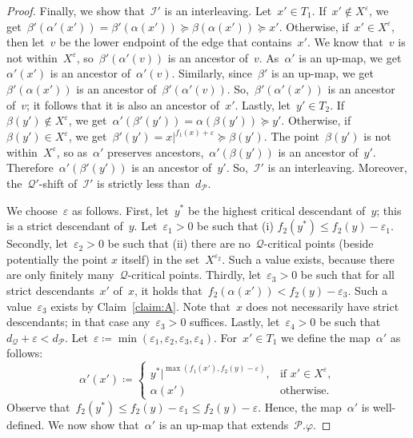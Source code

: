 \documentclass[a4paper,UKenglish, autoref, thm-restate, cleveref]{lipics-v2021}
\newcommand{\an}[2]{#1|^{#2}}
\newcommand{\resdist}[1]{d_{#1}}
\newcommand{\eps}{\varepsilon}
\renewcommand{\phi}{\varphi}
\newcommand{\I}{\mathcal{I}}
\renewcommand{\P}{\mathcal{P}}
\newcommand{\Q}{\mathcal{Q}}
\begin{document}
\begin{proof}
    Finally, we show that~$\I'$ is an interleaving.
    Let~$x' \in T_1$.
    If~$x' \notin X^\eps$, we get~$\beta'(\alpha'(x')) = \beta'(\alpha(x')) \succeq \beta(\alpha(x')) \succeq x'$.
    Otherwise, if~$x' \in X^\eps$, then let~$v$ be the lower endpoint of the edge that contains~$x'$.
    We know that~$v$ is not within~$X^\eps$, so~$\beta'(\alpha'(v))$ is an ancestor of~$v$.
    As~$\alpha'$ is an up-map, we get~$\alpha'(x')$ is an ancestor of~$\alpha'(v)$.
    Similarly, since~$\beta'$ is an up-map, we get~$\beta'(\alpha(x'))$ is an ancestor of~$\beta'(\alpha'(v))$.
    So,~$\beta'(\alpha'(x'))$ is an ancestor of~$v$; it follows that it is also an ancestor of~$x'$.
    Lastly, let~$y' \in T_2$.
    If~$\beta(y') \notin X^\eps$, we get~$\alpha'(\beta'(y')) = \alpha(\beta(y')) \succeq y'$.
    Otherwise, if~$\beta(y') \in X^\eps$, we get~$\beta'(y') = \an{x}{f_1(x) + \eps} \succeq \beta(y')$.
    The point~$\beta(y')$ is not within~$X^\eps$, so as~$\alpha'$ preserves ancestors,~$\alpha'(\beta(y'))$ is an ancestor of~$y'$.
    Therefore~$\alpha'(\beta'(y'))$ is an ancestor of~$y'$.
    So,~$\I'$ is an interleaving.
    Moreover, the~$\Q'$-shift of~$\I'$ is strictly less than~$\resdist{\P}$.

    We choose~$\eps$ as follows.
    First, let~$y^*$ be the highest critical descendant of~$y$; this is a strict descendant of~$y$.
    Let~$\eps_1 > 0$ be such that (i) $f_2(y^*) \le f_2(y) - \eps_1$.
    Secondly, let~$\eps_2 > 0$ be such that (ii) there are no~$\Q$-critical points (beside potentially the point $x$ itself) in the set~$X^{\eps_2}$.
    Such a value exists, because there are only finitely many~$\Q$-critical points.
    Thirdly, let~$\eps_3 > 0$ be such that for all strict descendants~$x'$ of~$x$, it holds that~$f_2(\alpha(x')) < f_2(y) - \eps_3$.
    Such a value~$\eps_3$ exists by Claim~\ref{claim:A}.
    Note that~$x$ does not necessarily have strict descendants; in that case any~$\eps_3 > 0$ suffices.
    Lastly, let~$\eps_4 > 0$ be such that~$\resdist{\Q} + \eps < \resdist{\P}$.
    Let~$\eps \coloneqq \min(\eps_1, \eps_2, \eps_3, \eps_4)$.
    For~$x' \in T_1$ we define the map~$\alpha'$ as follows:
    \[
        \alpha'(x') \coloneqq \begin{cases}
            \an{y^*}{\max(f_1(x'), f_2(y)-\eps)}, & \text{if } x' \in X^\eps, \\
            \alpha(x') & \text{otherwise.}
        \end{cases}
    \]
    Observe that~$f_2(y^*) \le f_2(y) - \eps_1 \le f_2(y) - \eps$.
    Hence, the map~$\alpha'$ is well-defined.
    We now show that~$\alpha'$ is an up-map that extends~$\P.\phi$.


\end{proof}
\end{document}
